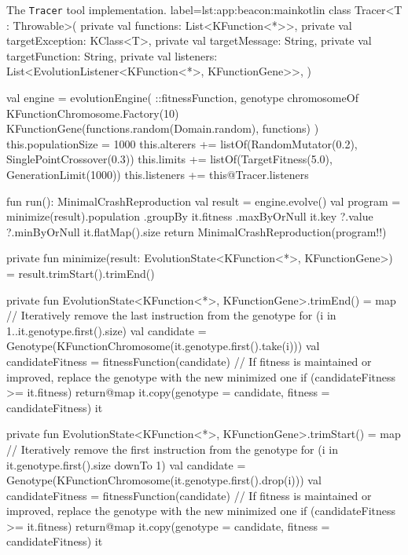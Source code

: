 \begin{code}{%
    The \texttt{Tracer} tool implementation.
}{label=lst:app:beacon:main}{kotlin}
    class Tracer<T : Throwable>(
        private val functions: List<KFunction<*>>,
        private val targetException: KClass<T>,
        private val targetMessage: String,
        private val targetFunction: String,
        private val listeners: List<EvolutionListener<KFunction<*>, KFunctionGene>>,
    ) {
        val engine = evolutionEngine(
            ::fitnessFunction,
            genotype {
                chromosomeOf {
                    KFunctionChromosome.Factory(10) {
                        KFunctionGene(functions.random(Domain.random), functions)
                    }
                }
            }
        ) {
            this.populationSize = 1000
            this.alterers += listOf(RandomMutator(0.2), SinglePointCrossover(0.3))
            this.limits += listOf(TargetFitness(5.0), GenerationLimit(1000))
            this.listeners += this@Tracer.listeners
        }

        fun run(): MinimalCrashReproduction {
            val result = engine.evolve()
            val program = minimize(result).population
                .groupBy { it.fitness }
                .maxByOrNull { it.key }?.value
                ?.minByOrNull { it.flatMap().size }
            return MinimalCrashReproduction(program!!)
        }

        private fun minimize(result: EvolutionState<KFunction<*>, KFunctionGene>) = 
            result.trimStart().trimEnd()

        private fun EvolutionState<KFunction<*>, KFunctionGene>.trimEnd() = map {
            // Iteratively remove the last instruction from the genotype
            for (i in 1..it.genotype.first().size) {
                val candidate = Genotype(KFunctionChromosome(it.genotype.first().take(i)))
                val candidateFitness = fitnessFunction(candidate)
                // If fitness is maintained or improved, replace the genotype with the new minimized one
                if (candidateFitness >= it.fitness) {
                    return@map it.copy(genotype = candidate, fitness = candidateFitness)
                }
            }
            it
        }


        private fun EvolutionState<KFunction<*>, KFunctionGene>.trimStart() = map {
            // Iteratively remove the first instruction from the genotype
            for (i in it.genotype.first().size downTo 1) {
                val candidate = Genotype(KFunctionChromosome(it.genotype.first().drop(i)))
                val candidateFitness = fitnessFunction(candidate)
                // If fitness is maintained or improved, replace the genotype with the new minimized one
                if (candidateFitness >= it.fitness) {
                    return@map it.copy(genotype = candidate, fitness = candidateFitness)
                }
            }
            it
        }

}
\end{code}
